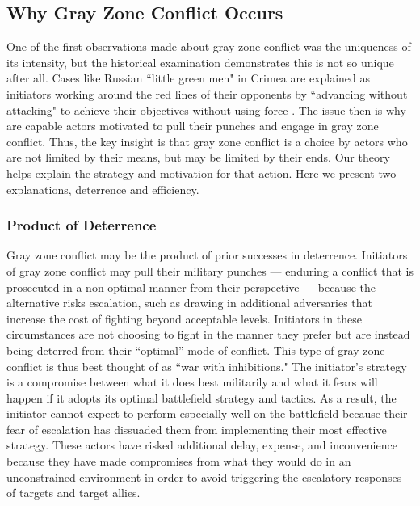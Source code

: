 \documentclass[12pt,letterpaper]{article}
\begin{document}
	\subsection{Why Gray Zone Conflict Occurs}
		One of the first observations made about gray zone conflict was the uniqueness of its intensity, but the historical examination demonstrates this is not so unique after all. Cases like Russian ``little green men" in Crimea are explained as initiators working around the red lines of their opponents by ``advancing without attacking" to achieve their objectives without using force \citep{altman_advancingattackingstrategic_2017}. The issue then is why are capable actors motivated to pull their punches and engage in gray zone conflict. Thus, the key insight is that gray zone conflict is a choice by actors who are not limited by their means, but may be limited by their ends. Our theory helps explain the strategy and motivation for that action. Here we present two explanations, deterrence and efficiency.

		\subsubsection{Product of Deterrence}
			Gray zone conflict may be the product of prior successes in deterrence. Initiators of gray zone conflict may pull their military punches --- enduring a conflict that is prosecuted in a non-optimal manner from their perspective --- because the alternative risks escalation, such as drawing in additional adversaries that increase the cost of fighting beyond acceptable levels. Initiators in these circumstances are not choosing to fight in the manner they prefer but are instead being deterred from their ``optimal'' mode of conflict. This type of gray zone conflict is thus best thought of as ``war with inhibitions." The initiator's strategy is a compromise between what it does best militarily and what it fears will happen if it adopts its optimal battlefield strategy and tactics. As a result, the initiator cannot expect to perform especially well on the battlefield because their fear of escalation has dissuaded them from implementing their most effective strategy. These actors have risked additional delay, expense, and inconvenience because they have made compromises from what they would do in an unconstrained environment in order to avoid triggering the escalatory responses of targets and target allies.
			
\end{document}
